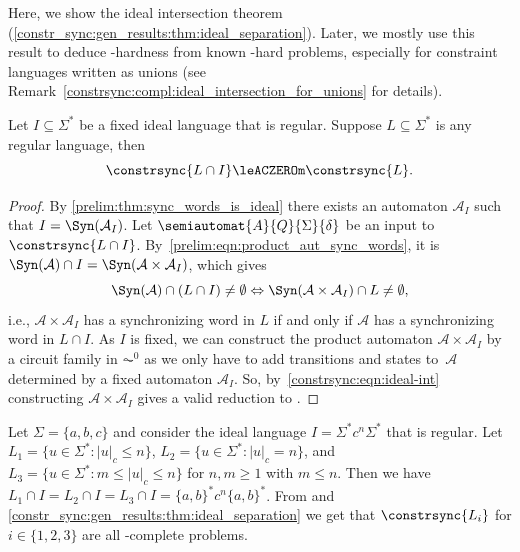 
Here, we show the ideal intersection theorem (\cref{constr_sync:gen_results:thm:ideal_separation}).
Later, we mostly use this result
to deduce \PSPACE-hardness from known \PSPACE-hard problems, especially
for constraint languages written as unions (see Remark~\ref{constrsync:compl:ideal_intersection_for_unions} for details).

\begin{theorem}
	\label{constr_sync:gen_results:thm:ideal_separation}
	Let $I \subseteq \Sigma^*$ be a fixed ideal language that is regular.
	Suppose $L \subseteq \Sigma^*$ is any regular language,
	then
	$$
	\constrsync{L \cap I} \leACZEROm \constrsync{L}.
	$$
\end{theorem}
\begin{proof}
	By \cref{prelim:thm:sync_words_is_ideal}
	there exists an automaton $\mathcal A_I$
	such that $I = \Syn(\mathcal A_I)$.
	Let $\semiautomat{A}{Q}{\Sigma}{\delta}$ be an input to $\constrsync{L\cap I}$.
	By~\cref{prelim:eqn:product_aut_sync_words}, 
	it is $\Syn(\mathcal A) \cap I = \Syn(\mathcal A \times \mathcal A_I)$,
	which gives	
	\begin{equation}\label{constrsync:eqn:ideal-int}
	\Syn(\mathcal A) \cap (L \cap I) \ne \emptyset
	\Leftrightarrow 
    \Syn(\mathcal A \times \mathcal A_I) \cap L \ne \emptyset,
	\end{equation}
	i.e., $\mathcal A \times \mathcal A_I$ has a synchronizing
	word in $L$ if and only if $\mathcal A$ has a synchronizing word in $L \cap I$.
	As $I$ is fixed,
	we can construct the product automaton $\mathcal A \times \mathcal A_I$
	by a circuit family in $\AC^0$ 
	 as we only have to add transitions
	and states to~$\mathcal A$ determined by a fixed automaton $\mathcal A_I$.
	So, by~\cref{constrsync:eqn:ideal-int} 
	constructing $\mathcal A \times \mathcal A_I$ gives a valid reduction to .	
\end{proof}

\begin{example}
	Let $\Sigma = \{a,b,c\}$ and consider the ideal language $I = \Sigma^* c^{n} \Sigma^*$
	that is regular.
	Let $L_1 = \{ u \in \Sigma^* : |u|_c \le n \}$,
	$L_2 = \{ u \in \Sigma^* : |u|_c = n \}$,
	and $L_3 = \{ u \in \Sigma^* : m \le |u|_c \le n \}$
	for $n,m \ge 1$ with $m \le n$.
	Then we have
	$L_1 \cap I = L_2 \cap I = L_3 \cap I = \{a,b\}^* c^n \{a,b\}^*$.
	From  
	and \cref{constr_sync:gen_results:thm:ideal_separation} 
	we get that $\constrsync{L_i}$
	for $i\in \{1,2,3\}$
	are all \PSPACE-complete problems.
\end{example}


